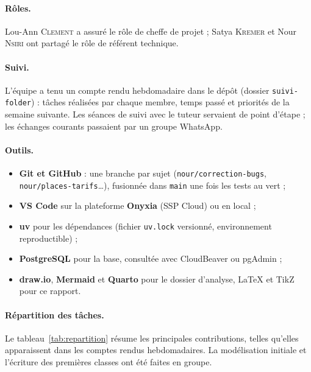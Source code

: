 \documentclass[11pt,a4paper]{article}
\newcommand{\code}[1]{\texttt{#1}}
\begin{document}
\paragraph{Rôles.}
Lou-Ann \textsc{Clement} a assuré le rôle de cheffe de projet ; Satya \textsc{Kremer} et Nour
\textsc{Nsiri} ont partagé le rôle de référent technique.

\paragraph{Suivi.}
L'équipe a tenu un compte rendu hebdomadaire dans le dépôt (dossier \code{suivi-folder}) : tâches
réalisées par chaque membre, temps passé et priorités de la semaine suivante. Les séances de suivi
avec le tuteur servaient de point d'étape ; les échanges courants passaient par un groupe WhatsApp.

\paragraph{Outils.}
\begin{itemize}[nosep]
  \item \textbf{Git et GitHub} : une branche par sujet (\code{nour/correction-bugs},
        \code{nour/places-tarifs}\dots), fusionnée dans \code{main} une fois les tests au vert ;
  \item \textbf{VS Code} sur la plateforme \textbf{Onyxia} (SSP Cloud) ou en local ;
  \item \textbf{uv} pour les dépendances (fichier \code{uv.lock} versionné, environnement
        reproductible) ;
  \item \textbf{PostgreSQL} pour la base, consultée avec CloudBeaver ou pgAdmin ;
  \item \textbf{draw.io}, \textbf{Mermaid} et \textbf{Quarto} pour le dossier d'analyse,
        \LaTeX{} et TikZ pour ce rapport.
\end{itemize}

\paragraph{Répartition des tâches.}
Le tableau~\ref{tab:repartition} résume les principales contributions, telles qu'elles apparaissent
dans les comptes rendus hebdomadaires. La modélisation initiale et l'écriture des premières classes
ont été faites en groupe.
\end{document}
